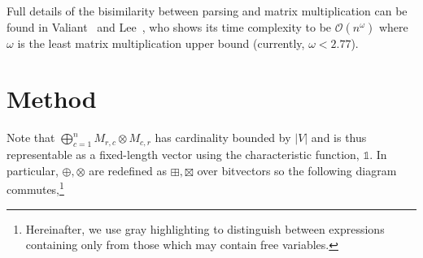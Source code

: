 \documentclass[sigplan,nonacm,anonymous]{acmart}\settopmatter{printfolios=false,printccs=false,printacmref=false}
\begin{document}
  \noindent Full details of the bisimilarity between parsing and matrix multiplication can be found in Valiant~\cite{valiant1975general} and Lee~\cite{lee2002fast}, who shows its time complexity to be $\mathcal{O}(n^\omega)$ where $\omega$ is the least matrix multiplication upper bound (currently, $\omega < 2.77$).

  \pagebreak\section{Method}

  Note that $\bigoplus_{c = 1}^n M_{r,c} \otimes M_{c,r}$ has cardinality bounded by $|V|$ and is thus representable as a fixed-length vector using the characteristic function, $\mathds{1}$. In particular, $\oplus, \otimes$ are redefined as $\boxplus, \boxtimes$ over bitvectors so the following diagram commutes,\footnote{Hereinafter, we use gray highlighting to distinguish between expressions containing only  from those which may contain free variables.}
\end{document}
